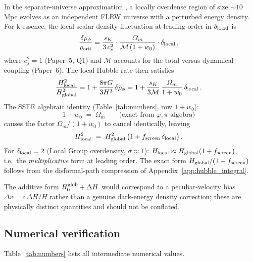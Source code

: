 \documentclass[12pt,a4paper]{article}
\newcommand{\phiG}{\varphi}
\newcommand{\MIRA}{\mathcal{M}}
\newcommand{\Omm}{\Omega_{m}}
\newcommand{\fsc}{f_{\mathrm{screen}}}
\newcommand{\sK}{s_K}          %
\renewcommand{\Omega}{\varOmega}
\begin{document}
In the separate-universe approximation \citep{Wands2000,Brax2014}, a locally
overdense region of size $\sim 10$\,Mpc evolves as an independent FLRW universe
with a perturbed energy density.  For k-essence, the local scalar density
fluctuation at leading order in $\delta_{\rm local}$ is
\begin{equation}
  \frac{\delta\rho_\phi}{\rho_{\rm crit}}
  = \frac{\sK}{3\,c_s^2}
    \cdot \frac{\Omm}{\mathcal{M}\,(1+w_0)}
    \cdot \delta_{\rm local}\,,
  \label{eq:drho_phi}
\end{equation}
where $c_s^2 = 1$ (Paper~5, Q1) and $\mathcal{M}$ accounts for the%
 total-versus-dynamical
coupling (Paper~6).  The local Hubble rate then satisfies
\begin{equation}
  \frac{H_{\rm local}^2}{H_{\rm global}^2}
  = 1 + \frac{8\pi G}{3H^2}\,\delta\rho_\phi
  = 1 + \frac{\sK}{3\MIRA}\,\frac{\Omm}{1+w_0}\,\delta_{\rm local}\,.
  \label{eq:H2ratio}
\end{equation}
The SSEE algebraic identity (Table~\ref{tab:numbers}, row $1+w_0$):
\begin{equation}
  1 + w_0 \;=\; \Omm \qquad \text{(exact from $\phiG,\pi$ algebra)}
  \label{eq:identity_1pw0}
\end{equation}
causes the factor $\Omm/(1+w_0)$ to cancel identically, leaving
\begin{equation}
  H_{\rm local}^2 \;=\; H_{\rm global}^2\,\bigl(1 + \fsc\,\delta_{\rm local}\bigr)\,.
\end{equation}
For $\delta_{\rm local} = 2$ (Local Group overdensity, $\sigma \approx 1$):
$H_{\rm local} \approx H_{\rm global}(1 + \fsc)$, i.e.\ the \emph{multiplicative}
form at leading order.  The exact form $H_{\rm global}/(1-\fsc)$ follows from
the disformal-path compression of Appendix~\ref{app:hubble_integral}.

The additive form $H_0^{\rm glob} + \Delta H$ would correspond to a peculiar-velocity
bias $\Delta v = c\,\Delta H/H$ rather than a genuine dark-energy density correction;
these are physically distinct quantities and should not be conflated.

\subsection{Numerical verification}
\label{sec:numerics}

Table~\ref{tab:numbers} lists all intermediate numerical values.
\end{document}
